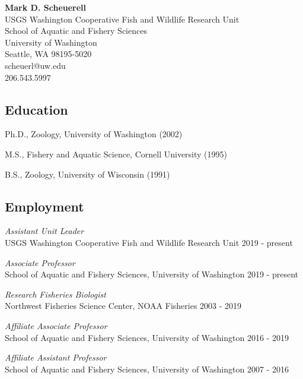 \documentclass[
]{article}
\author{}
\date{\vspace{-2.5em}}
\begin{document}
\begin{center}
\textbf{Mark D. Scheuerell} \\  
USGS Washington Cooperative Fish and Wildlife Research Unit  \\
School of Aquatic and Fishery Sciences \\
University of Washington  \\
Seattle, WA 98195-5020  \\
scheuerl@uw.edu  \\
206.543.5997
\end{center}

\hypertarget{education}{%
\subsection{Education}\label{education}}

\vspace{-5pt}

Ph.D., Zoology, University of Washington (2002)

M.S., Fishery and Aquatic Science, Cornell University (1995)

B.S., Zoology, University of Wisconsin (1991)

\hypertarget{employment}{%
\subsection{Employment}\label{employment}}

\vspace{-5pt}

\emph{Assistant Unit Leader}\\
USGS Washington Cooperative Fish and Wildlife Research Unit \hfill 2019
- present

\emph{Associate Professor}\\
School of Aquatic and Fishery Sciences, University of Washington
\hfill 2019 - present

\emph{Research Fisheries Biologist}\\
Northwest Fisheries Science Center, NOAA Fisheries \hfill 2003 - 2019

\emph{Affiliate Associate Professor}\\
School of Aquatic and Fishery Sciences, University of Washington
\hfill 2016 - 2019

\emph{Affiliate Assistant Professor}\\
School of Aquatic and Fishery Sciences, University of Washington
\hfill 2007 - 2016
\end{document}
